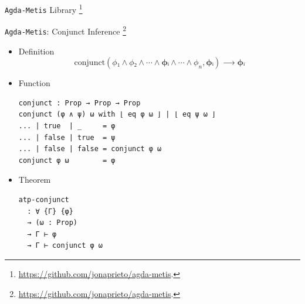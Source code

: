 \documentclass[10pt, xetex, hyperref={pdfpagelabels=false}]{beamer}
\begin{document}
\begin{frame}[fragile, label=agda-metis]{\texttt{Agda-Metis} Library
  \footnote{\url{https://github.com/jonaprieto/agda-metis}.}}
\vfill
\begin{table}[!ht]
\begin{center}
\end{center}
\label{tab:agda-metis-table}
\end{table}
\vfill
\end{frame}


\begin{frame}[fragile, label=atp-conjunct]{\texttt{Agda-Metis}: Conjunct Inference
  \footnote{\url{https://github.com/jonaprieto/agda-metis}.}}
\begin{itemize}
\item Definition
  \begin{equation*}
  \text{conjunct}(ϕ₁ ∧  ϕ₂ ∧ ⋯ ∧ \mathbf{ϕᵢ} ∧ ⋯ ∧ \phi_n, \mathbf{ϕᵢ}) ⟶ \mathbf{ϕᵢ}
  \end{equation*}

\item Function
\vspace*{1mm}
\begin{verbatim}
conjunct : Prop → Prop → Prop
conjunct (φ ∧ ψ) ω with ⌊ eq φ ω ⌋ | ⌊ eq ψ ω ⌋
... | true  | _     = φ
... | false | true  = ψ
... | false | false = conjunct φ ω
conjunct φ ω        = φ
\end{verbatim}
\item Theorem
\vspace*{1mm}
\begin{verbatim}
atp-conjunct
  : ∀ {Γ} {φ}
  → (ω : Prop)
  → Γ ⊢ φ
  → Γ ⊢ conjunct φ ω
\end{verbatim}
\end{itemize}
\end{frame}
\end{document}
